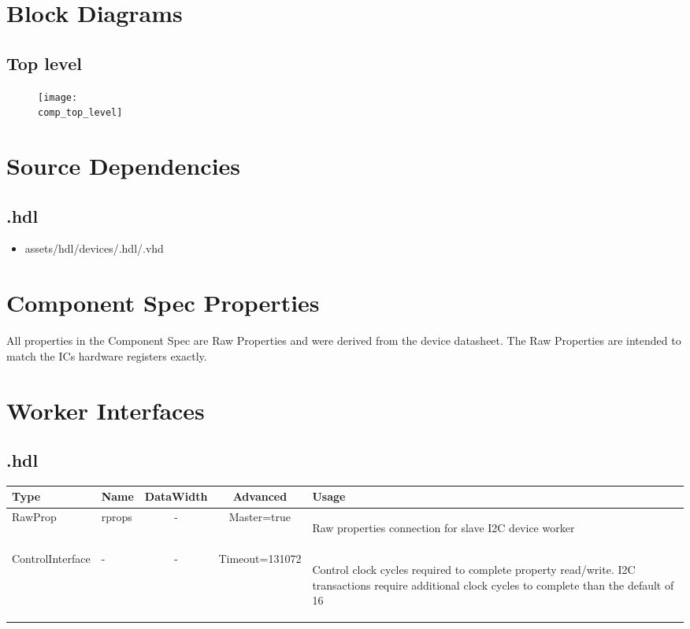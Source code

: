 \section*{Block Diagrams}
\subsection*{Top level}
\begin{figure}[ht]
	\centerline{\texttt{[image: \\comp\_top\_level]}}
	\label{fig:tb}
\end{figure}

\section*{Source Dependencies}
\subsection*{\comp.hdl}
\begin{itemize}
	\item assets/hdl/devices/\comp.hdl/\comp.vhd
\end{itemize}

\begin{landscape}
\section*{Component Spec Properties}
All properties in the Component Spec are Raw Properties and were derived from the device datasheet\cite{datasheet}. The Raw Properties are intended to match the ICs hardware registers exactly.
	\section*{Worker Interfaces}
	\subsection*{\comp.hdl}
	\begin{scriptsize}
		\begin{tabular}{|M{2cm}|M{1.5cm}|c|c|M{12cm}|}
			\hline
			Type & Name & DataWidth & Advanced & Usage \\
			\hline
			RawProp
			& rprops
			& -
			& Master=true
			& \begin{flushleft}Raw properties connection for slave I2C device worker\end{flushleft}\\
			\hline
			ControlInterface
			& -
			& -
			& Timeout=131072
			& \begin{flushleft}Control clock cycles required to complete property  read/write. I2C transactions require additional clock cycles to complete than the default of 16 \end{flushleft}\\
			\hline
		\end{tabular}
	\end{scriptsize}
\end{landscape}

